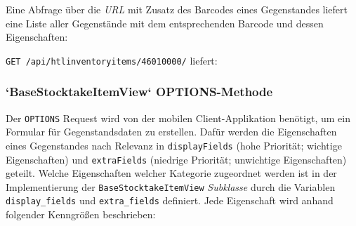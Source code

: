 Eine Abfrage über die \emph{URL}
 mit Zusatz des Barcodes
eines Gegenstandes liefert eine Liste aller Gegenstände mit dem
entsprechenden Barcode und dessen Eigenschaften:

\texttt{GET\ /api/htlinventoryitems/46010000/} liefert:

\begin{Shaded}
\begin{Highlighting}[]
\FunctionTok{\{}
    \FunctionTok{:} \OtherTok{[}\FunctionTok{\{}
            \FunctionTok{:} \FunctionTok{,}
            \FunctionTok{:} \FunctionTok{,}
            \FunctionTok{:} \FunctionTok{,}
            \FunctionTok{:} \FunctionTok{,}
            \FunctionTok{:} \FunctionTok{,}
            \FunctionTok{:} \FunctionTok{\{}
                \FunctionTok{:} \FunctionTok{,}
                \ErrorTok{[...]}
            \FunctionTok{\},}
            \FunctionTok{:} \OtherTok{[]}
        \FunctionTok{\}}
    \OtherTok{]}
\FunctionTok{\}}
\end{Highlighting}
\end{Shaded}

\subsubsection*{`BaseStocktakeItemView` OPTIONS-Methode}

Der \texttt{OPTIONS} Request wird von der mobilen Client-Applikation
benötigt, um ein Formular für Gegenstandsdaten zu erstellen. Dafür
werden die Eigenschaften eines Gegenstandes nach Relevanz in
\texttt{displayFields} (hohe Priorität; wichtige Eigenschaften) und
\texttt{extraFields} (niedrige Priorität; unwichtige Eigenschaften)
geteilt. Welche Eigenschaften welcher Kategorie zugeordnet werden ist in
der Implementierung der \texttt{BaseStocktakeItemView}
\emph{Subklasse}
durch die Variablen \texttt{display\_fields} und \texttt{extra\_fields}
definiert. Jede Eigenschaft wird anhand folgender Kenngrößen
beschrieben:

